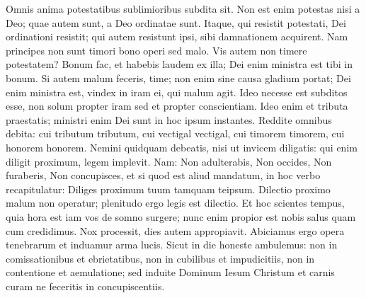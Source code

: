 \begin{biblechapter}  
\verse Omnis anima potestatibus sublimioribus subdita sit. Non est enim potestas nisi a Deo; quae autem sunt, a Deo ordinatae sunt. 
\verse Itaque, qui resistit potestati, Dei ordinationi resistit; qui autem resistunt ipsi, sibi damnationem acquirent. 
\verse Nam principes non sunt timori bono operi sed malo. Vis autem non timere potestatem? Bonum fac, et habebis laudem ex illa; 
\verse Dei enim ministra est tibi in bonum. Si autem malum feceris, time; non enim sine causa gladium portat; Dei enim ministra est, vindex in iram ei, qui malum agit. 
\verse Ideo necesse est subditos esse, non solum propter iram sed et propter conscientiam. 
\verse Ideo enim et tributa praestatis; ministri enim Dei sunt in hoc ipsum instantes. 
\verse Reddite omnibus debita: cui tributum tributum, cui vectigal vectigal, cui timorem timorem, cui honorem honorem. 
\verse Nemini quidquam debeatis, nisi ut invicem diligatis: qui enim diligit proximum, legem implevit. 
\verse Nam: Non adulterabis, Non occides, Non furaberis, Non concupisces, et si quod est aliud mandatum, in hoc verbo recapitulatur: Diliges proximum tuum tamquam teipsum. 
\verse Dilectio proximo malum non operatur; plenitudo ergo legis est dilectio. 
\verse Et hoc scientes tempus, quia hora est iam vos de somno surgere; nunc enim propior est nobis salus quam cum credidimus. 
\verse Nox processit, dies autem appropiavit. Abiciamus ergo opera tenebrarum et induamur arma lucis. 
\verse Sicut in die honeste ambulemus: non in comissationibus et ebrietatibus, non in cubilibus et impudicitiis, non in contentione et aemulatione; 
\verse sed induite Dominum Iesum Christum et carnis curam ne feceritis in concupiscentiis. 
\end{biblechapter}

